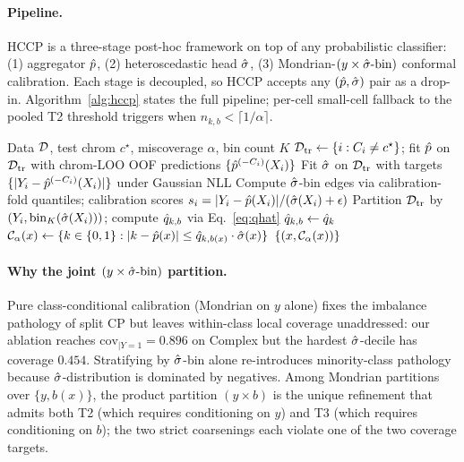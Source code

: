 
\paragraph{Pipeline.}
HCCP is a three-stage post-hoc framework on top of any probabilistic classifier: (1) aggregator $\hat{p}$, (2) heteroscedastic head $\hat{\sigma}$, (3) Mondrian-$(y \times \hat{\sigma}\text{-bin})$ conformal calibration. Each stage is decoupled, so HCCP accepts any $(\hat{p}, \hat{\sigma})$ pair as a drop-in. Algorithm~\ref{alg:hccp} states the full pipeline; per-cell small-cell fallback to the pooled T2 threshold triggers when $n_{k,b} < \lceil 1/\alpha\rceil$.

\begin{algorithm}[t]
\caption{HCCP --- Heteroscedastic Class-Conditional Conformal Prediction}
\label{alg:hccp}
\begin{algorithmic}[1]
\Require Data $\mathcal{D}$, test chrom $c^\star$, miscoverage $\alpha$, bin count $K$
\State $\mathcal{D}_{\text{tr}} \gets \{i : C_i \neq c^\star\}$; fit $\hat{p}$ on $\mathcal{D}_{\text{tr}}$ with chrom-LOO OOF predictions $\{\hat{p}^{(-C_i)}(X_i)\}$
\State Fit $\hat{\sigma}$ on $\mathcal{D}_{\text{tr}}$ with targets $\{|Y_i - \hat{p}^{(-C_i)}(X_i)|\}$ under Gaussian NLL
\State Compute $\hat{\sigma}$-bin edges via calibration-fold quantiles; calibration scores $s_i = |Y_i - \hat{p}(X_i)| / (\hat{\sigma}(X_i) + \epsilon)$
\State Partition $\mathcal{D}_{\text{tr}}$ by $(Y_i, \mathrm{bin}_K(\hat{\sigma}(X_i)))$; compute $\hat{q}_{k, b}$ via Eq.~\eqref{eq:qhat}
    \State $\hat{q}_{k, b} \gets \hat{q}_k$ 
\EndFor
{}
    \State $\mathcal{C}_\alpha(x) \gets \{k \in \{0, 1\} : |k - \hat{p}(x)| \leq \hat{q}_{k, b(x)} \cdot \hat{\sigma}(x)\}$
\EndFor
\State \Return $\{(x, \mathcal{C}_\alpha(x))\}$
\end{algorithmic}
\end{algorithm}

\paragraph{Why the joint $(y \times \hat{\sigma}\text{-bin})$ partition.}
Pure class-conditional calibration (Mondrian on $y$ alone) \citep{vovk2003mondrian} fixes the imbalance pathology of split CP but leaves within-class local coverage unaddressed: our ablation reaches $\mathrm{cov}_{|Y=1} = 0.896$ on Complex but the hardest $\hat{\sigma}$-decile has coverage $0.454$. Stratifying by $\hat{\sigma}$-bin alone re-introduces minority-class pathology because $\hat{\sigma}$-distribution is dominated by negatives. Among Mondrian partitions over $\{y, b(x)\}$, the product partition $(y \times b)$ is the unique refinement that admits both T2 (which requires conditioning on $y$) and T3 (which requires conditioning on $b$); the two strict coarsenings each violate one of the two coverage targets.

